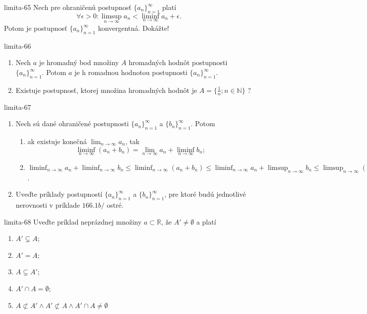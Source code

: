 \begin{defproblem}{limita-65}
Nech pre ohraničenú postupnosť ${\{a_n\}}_{n=1}^\infty$ platí $$\forall \epsilon > 0: \limsup_{n \rightarrow \infty} a_n < \liminf_{n \rightarrow \infty} a_n+\epsilon.$$ Potom je postupnosť ${\{a_n\}}_{n=1}^\infty$ konvergentná. Dokážte! 
\end{defproblem}

\begin{defproblem}{limita-66}
\begin{enumerate}
\item Nech $a$ je hromadný bod množiny $A$ hromadných hodnôt postupnosti ${\{a_n\}}_{n=1}^\infty$. Potom $a$ je h romadnou hodnotou postupnosti ${\{a_n\}}_{n=1}^\infty$.
\item Existuje postupnosť, ktorej množina hromadných hodnôt je $A=\{ \frac{1}{n}; n \in \mathbb{N} \}$ ?
\end{enumerate}
\end{defproblem}

\begin{defproblem}{limita-67}
\begin{enumerate}
\item Nech sú dané ohraničené postupnosti ${\{a_n\}}_{n=1}^\infty$ a ${\{b_n\}}_{n=1}^\infty$. Potom
\begin{enumerate}
\item ak existuje konečná $\lim_{n \rightarrow \infty} a_n$, tak 
$$\liminf_{n \rightarrow \infty} (a_n+b_n)=\lim_{n \rightarrow \infty} a_n+\liminf_{n \rightarrow \infty} b_n;$$
\item $\liminf_{n \rightarrow \infty} a_n+\liminf_{n \rightarrow \infty} b_n \leq \liminf_{n \rightarrow \infty} (a_n+b_n)\leq \liminf_{n \rightarrow \infty} a_n+\limsup_{n \rightarrow \infty} b_n\leq \limsup_{n \rightarrow \infty} (a_n+b_n) \leq \limsup_{n \rightarrow \infty} a_n+\limsup_{n \rightarrow \infty} b_n$.
\end{enumerate}
\item Uveďte príklady postupností ${\{a_n\}}_{n=1}^\infty$ a ${\{b_n\}}_{n=1}^\infty$, pre ktoré budú jednotlivé nerovnosti v príklade $166.1b/$ ostré.
\end{enumerate}
\end{defproblem}

\begin{defproblem}{limita-68}
Uveďte príklad neprázdnej množiny $a \subset \mathbb{R}$, že $A' \neq \emptyset$ a platí
\begin{enumerate}
\item $A' \subsetneq A$;
\item $A'=A$;
\item $A \subsetneq A'$;
\item $A' \cap A = \emptyset$;
\item $A \not\subset A'\wedge A' \not\subset A \wedge A' \cap A \neq\emptyset$
\end{enumerate} 
\end{defproblem}


